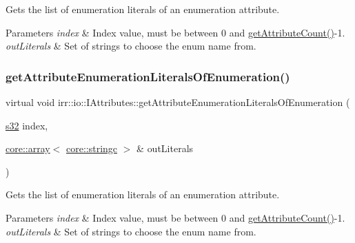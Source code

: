 Gets the list of enumeration literals of an enumeration attribute. 


\begin{DoxyParams}{Parameters}
{\em index} & Index value, must be between 0 and \hyperlink{classirr_1_1io_1_1IAttributes_a796bdd9440ee7ba0b6742a90a82870b6}{get\+Attribute\+Count()}-\/1. \\
\hline
{\em out\+Literals} & Set of strings to choose the enum name from. \\
\hline
\end{DoxyParams}
\mbox{\label{classirr_1_1io_1_1IAttributes_ae5d5d0c42a5a0199baf12abe971cb610}} 
\subsubsection{\texorpdfstring{get\+Attribute\+Enumeration\+Literals\+Of\+Enumeration()}{getAttributeEnumerationLiteralsOfEnumeration()}\hspace{0.1cm}{\footnotesize\ttfamily [4/4]}}
{\footnotesize\ttfamily virtual void irr\+::io\+::\+I\+Attributes\+::get\+Attribute\+Enumeration\+Literals\+Of\+Enumeration (\begin{DoxyParamCaption}\item[{\hyperlink{namespaceirr_ac66849b7a6ed16e30ebede579f9b47c6}{s32}}]{index,  }\item[{\hyperlink{classirr_1_1core_1_1array}{core\+::array}$<$ \hyperlink{namespaceirr_1_1core_ab26a0e0359206b5a694f35c37c829d7f}{core\+::stringc} $>$ \&}]{out\+Literals }\end{DoxyParamCaption})\hspace{0.3cm}{\ttfamily [pure virtual]}}



Gets the list of enumeration literals of an enumeration attribute. 


\begin{DoxyParams}{Parameters}
{\em index} & Index value, must be between 0 and \hyperlink{classirr_1_1io_1_1IAttributes_a796bdd9440ee7ba0b6742a90a82870b6}{get\+Attribute\+Count()}-\/1. \\
\hline
{\em out\+Literals} & Set of strings to choose the enum name from. \\
\hline
\end{DoxyParams}
\mbox{\label{classirr_1_1io_1_1IAttributes_adee33f518d95a1ca17146bb055c6e5f3}} 
